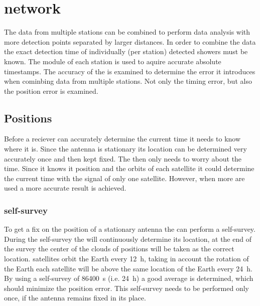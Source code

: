 \chapter{\hisparc network}
\label{ch:cluster}

The data from multiple \hisparc stations can be combined to perform data analysis with more detection points separated by larger distances. In order to combine the data the exact detection time of individually (per station) detected showers must be known. The \gps module of each station is used to aquire accurate absolute timestamps. The accuracy of the \gps is examined to determine the error it introduces when cominbing data from multiple stations. Not only the timing error, but also the position error is examined.


\section{Positions}

Before a \gps reciever can accurately determine the current time it needs to know where it is. Since the \gps antenna is stationary its location can be determined very accurately once and then kept fixed. The \gps then only needs to worry about the time. Since it knows it position and the orbits of each \gps satellite it could determine the current time with the signal of only one \gps satellite. However, when more are used a more accurate result is achieved.


\subsection{\gps self-survey}

To get a fix on the position of a stationary \gps antenna the \gps can perform a self-survey. During the self-survey the \gps will continuously determine its location, at the end of the survey the center of the clouds of positions will be taken as the correct location. \gps satellites orbit the Earth every \SI{12}{\hour}, taking in account the rotation of the Earth each \gps satellite will be above the same location of the Earth every \SI{24}{\hour}. By using a self-survey of \SI{86400}{\second} (i.e. \SI{24}{\hour}) a good average is determined, which should minimize the position error. This self-survey needs to be performed only once, if the \gps antenna remains fixed in its place.

